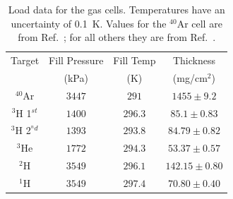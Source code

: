 \documentclass[final,5p,times,twocolumn]{elsarticle}
\begin{document}
\begin{table}[!h]
\centering
\begin{adjustbox}{width=0.5\textwidth}
\begin{tabular}{|c|c|c|c|}
	\hline 
	Target       & Fill Pressure & Fill Temp    & Thickness \\
	     		 &	(kPa)		 &	(K) 	    & (mg/cm$^2$) \\
	\hline 
	$^{40}$Ar	 & $3447$ 		 & $291$	    &  $1455\pm9.2$ \\ 
	\hline 
	$^{3}$H 1$^{st}$ 	 & $1400$		 & $296.3$	    &  $85.1\pm 0.83$ \\ 
	\hline 
	$^{3}$H 2$^{^nd}$	 & $1393$		 & $293.8$		&  $84.79\pm0.82$ \\
	\hline
	$^{3}$He	 & $1772$		 & $294.3$	    &  $53.37\pm0.57$ \\ 
	\hline 
	$^{2}$H 	 & $3549$		 & $296.1$	    &  $142.15\pm0.80$ \\ 
	\hline 
	$^{1}$H 	 & $3549$		 & $297.4$	    &  $70.80\pm0.40$ \\ 
	\hline 
\end{tabular}
\end{adjustbox}
\caption{Load data for the gas cells. Temperatures have an uncertainty of 0.1~K.  Values for the $^{40}$Ar 
         cell are from Ref.~\cite{ar_config}; for all others they are from Ref.~\cite{cellconfig}.}
\label{tab:fill_tar}
\end{table}
\end{document}
